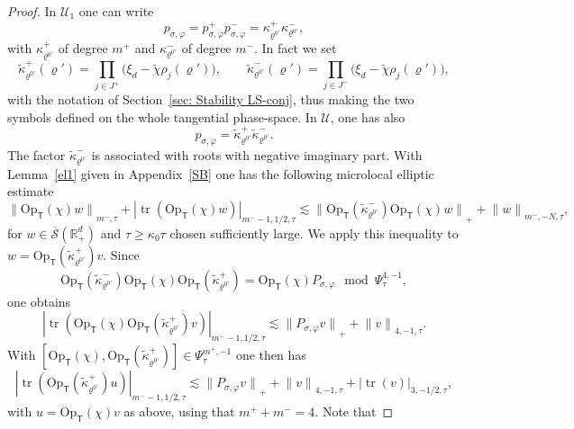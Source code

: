 \documentclass[JEP,XML,SOM,Unicode,published]{cedram}
\theoremstyle{plain}
\theoremstyle{definition}
\def\R{\mathbb{R}}
\newcommand{\suff}{sufficiently\xspace}
\let\k\kappa
\let\y\varrho
\newcommand{\tk}{\tilde{\kappa}}
\newcommand{\tchi}{\tilde{\chi}}
\newcommand{\U}{\mathscr U}
\newcommand{\Opt}{\ensuremath{\mathrm{Op}_{\scriptscriptstyle{\mathsf{T}}}}}
\newcommand{\Norm}[2]{{\| #1 \|}_{#2}}
\newcommand{\Normsc}[2]{{\| #1 \|}_{#2, \tau}}
\newcommand{\normsc}[2]{{| #1 |}_{#2, \tau}}
\newcommand{\Psisc}{\Psi_\tau}
\newcommand{\Pconj}{P_{\sigma,\varphi}}
\newcommand{\pconj}{p_{\sigma,\varphi}}
\newcommand{\Sbarp}{\ensuremath{\overline{\mathscr{S}}(\Rdp)}}
\newcommand{\Rdp}{\R^d_+}
\DeclareMathOperator{\trace}{tr}
\begin{document}
\begin{proof}
In $\U_1$ one can write\vspace*{-3pt}
\begin{equation*}
\pconj = \pconj^+ \pconj^-
= \k^+_{\y^{0\prime}} \k^-_{\y^{0\prime}},
\end{equation*}
with $\k^+_{\y^{0\prime}}$ of degree $m^+$ and $\k^-_{\y^{0\prime}}$
of degree $m^-$.
In fact we set
\begin{equation*}
\tk^+_{\y^{0\prime}} (\y')
= \prod_{j \in J^+} \big(\xi_d -\tchi \rho_j(\y')\big),
\qquad
\tk^-_{\y^{0\prime}} (\y')
= \prod_{j \in J^-} \big(\xi_d -\tchi \rho_j(\y')\big),
\end{equation*}
with the notation of Section~\ref{sec: Stability LS-conj},
thus making the two symbols defined on
the whole tangential phase-space.
In $\U$, one has also\vspace*{-3pt}
\begin{equation*}
\pconj
= \tk^+_{\y^{0\prime}} \tk^-_{\y^{0\prime}}.
\end{equation*}
The factor $\tk^-_{\y^{0\prime}}$ is associated with roots with
negative imaginary part. With Lemma~\ref{el1} given in
Appendix~\ref{SB} one has the following microlocal elliptic esti\-mate\vspace*{-3pt}
\[
\Normsc{\Opt(\chi)w}{m^-}
+ \normsc{\trace(\Opt(\chi)w)}{m^--1, 1/2}
\lesssim
\Norm{\Opt(\tk^-_{\y^{0\prime}}) \Opt(\chi)w}{+}
+ \Normsc{w}{m^-,-N},
\]
for $w \in \Sbarp$ and $\tau \geq \k_0 \tau$ chosen \suff large.
We apply this inequality to $w=\Opt(\tk^+_{\y^{0\prime}})v$.
Since\vspace*{-3pt}
\begin{equation*}
\Opt(\tk^-_{\y^{0\prime}}) \Opt(\chi)\Opt(\tk^+_{\y^{0\prime}}) =
\Opt(\chi) \Pconj \mod \Psisc^{4,-1},
\end{equation*}
one obtains\vspace*{-3pt}
\begin{equation*}
\normsc{\trace(\Opt(\chi) \Opt(\tk^+_{\y^{0\prime}})v)}{m^--1, 1/2}
\lesssim
\Norm{\Pconj v}{+}
+ \Normsc{v}{4,-1}.
\end{equation*}
With $[\Opt(\chi), \Opt(\tk^+_{\y^{0\prime}})] \in \Psisc^{m^+,-1}$ one
then has\vspace*{-3pt}
\begin{equation*}
\normsc{\trace(\Opt(\tk^+_{\y^{0\prime}}) u)}{m^--1, 1/2}
\lesssim
\Norm{\Pconj v}{+}
+ \Normsc{v}{4,-1}
+ \normsc{\trace(v)}{3,-1/2},
\end{equation*}
with $u= \Opt(\chi) v$ as above, using that $m^+ + m^-=4$.
Note that\vspace*{-3pt}

\end{proof}
\end{document}

